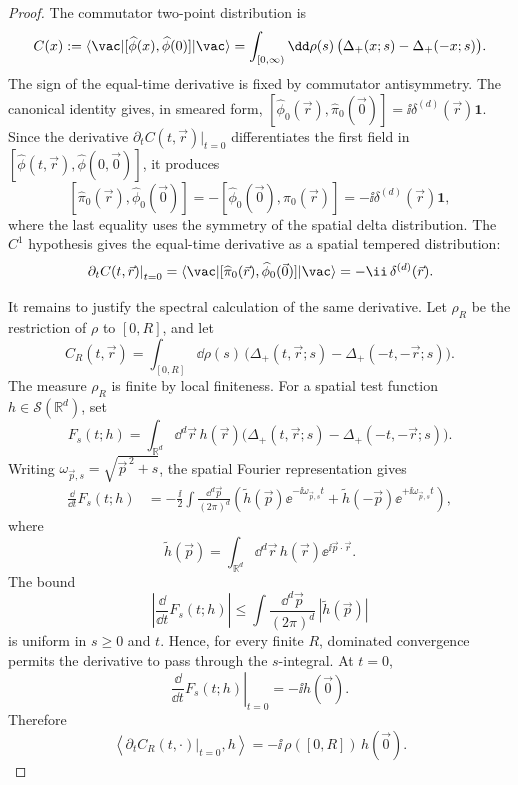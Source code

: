 \begin{proof}
The commutator two-point distribution is
\[
  C(x):=
  \langle\vac|[\widehat\phi(x),\widehat\phi(0)]|\vac\rangle
  =
  \int_{[0,\infty)}\dd\rho(s)\,
  \bigl(\Delta_+(x;s)-\Delta_+(-x;s)\bigr).
\]
The sign of the equal-time derivative is fixed by commutator antisymmetry.
The canonical identity gives, in smeared form,
\([\widehat\phi_0(\vec r),\widehat\pi_0(\vec0)]
=\ii\delta^{(d)}(\vec r)\mathbf1\).  Since the derivative
\(\partial_t C(t,\vec r)|_{t=0}\) differentiates the first field in
\([\widehat\phi(t,\vec r),\widehat\phi(0,\vec0)]\), it produces
\[
  [\widehat\pi_0(\vec r),\widehat\phi_0(\vec0)]
  =
  -[\widehat\phi_0(\vec0),\widehat\pi_0(\vec r)]
  =
  -\ii\delta^{(d)}(\vec r)\mathbf1,
\]
where the last equality uses the symmetry of the spatial delta distribution.
The \(C^1\) hypothesis gives the equal-time derivative as a spatial tempered
distribution:
\begin{equation}
  \left.\partial_t C(t,\vec r)\right|_{t=0}
  =
  \langle\vac|[\widehat\pi_0(\vec r),\widehat\phi_0(\vec 0)]|\vac\rangle
  =
  -\ii\,\delta^{(d)}(\vec r).
  \label{eq:kallen-lehmann-equal-time-commutator-derivative}
\end{equation}

It remains to justify the spectral calculation of the same derivative.  Let
\(\rho_R\) be the restriction of \(\rho\) to \([0,R]\), and let
\[
  C_R(t,\vec r)=
  \int_{[0,R]}\dd\rho(s)\,
  \bigl(\Delta_+(t,\vec r;s)-\Delta_+(-t,-\vec r;s)\bigr).
\]
The measure \(\rho_R\) is finite by local finiteness.  For a spatial test
function \(h\in\mathcal S(\mathbb R^d)\), set
\[
  F_s(t;h)=
  \int_{\mathbb R^d}\dd^d\vec r\,h(\vec r)
  \bigl(\Delta_+(t,\vec r;s)-\Delta_+(-t,-\vec r;s)\bigr).
\]
Writing \(\omega_{\vec p,s}=\sqrt{\vec p^{\,2}+s}\), the spatial Fourier
representation gives
\[
\begin{aligned}
  \frac{\dd}{\dd t}F_s(t;h)
  &=
  -\frac{\ii}{2}
  \int\frac{\dd^d\vec p}{(2\pi)^d}
  \left(
    \widetilde h(\vec p)\ee^{-\ii\omega_{\vec p,s}t}
    +
    \widetilde h(-\vec p)\ee^{+\ii\omega_{\vec p,s}t}
  \right),
\end{aligned}
\]
where
\[
  \widetilde h(\vec p)
  =
  \int_{\mathbb R^d}\dd^d\vec r\,
  h(\vec r)\ee^{\ii\vec p\cdot\vec r}.
\]
The bound
\[
  \left|\frac{\dd}{\dd t}F_s(t;h)\right|
  \le
  \int\frac{\dd^d\vec p}{(2\pi)^d}\,|\widetilde h(\vec p)|
\]
is uniform in \(s\ge0\) and \(t\).  Hence, for every finite \(R\), dominated
convergence permits the derivative to pass through the \(s\)-integral.  At
\(t=0\),
\[
  \left.\frac{\dd}{\dd t}F_s(t;h)\right|_{t=0}
  =
  -\ii h(\vec0).
\]
Therefore
\[
  \left\langle
    \left.\partial_t C_R(t,\cdot)\right|_{t=0},
    h
  \right\rangle
  =
  -\ii\,\rho([0,R])\,h(\vec0).
\]


\end{proof}
